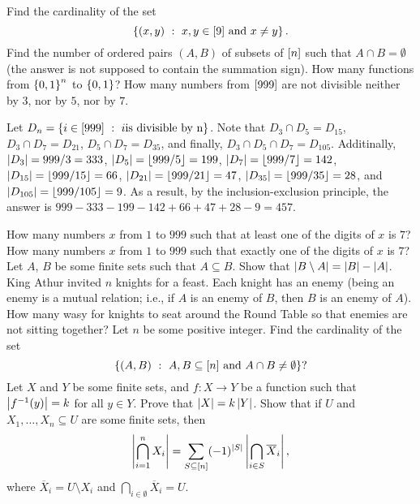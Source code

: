 \begin{chapterendexercises}
  \exercise
    Find the cardinality of the set
    \[
      \set[{x, y \in \range{9} \text{ and } x \neq y}]{(x, y)}.
    \]
  \exercise Find the number of ordered pairs $(A, B)$ of subsets of ${[{n}]}$
    such that $A \cap B = \emptyset$ (the answer is not supposed to contain the
    summation sign).
  \exercise How many functions from $\set{0, 1}^n$ to $\set{0, 1}$?
  \exercise[recommended] How many numbers from ${[{999}]}$ are not divisible neither by $3$,
    nor by $5$, nor by $7$.
    \begin{solution}
      Let $D_n = \set[i \text{is divisible by n}]{i \in \range{999}}$.
      Note that $D_3 \cap D_5 = D_{15}$, $D_3 \cap D_7 = D_{21}$, $D_5 \cap D_7
      = D_{35}$, and finally, $D_3 \cap D_5 \cap D_7 = D_{105}$. Additinally,
      $\left|{D_3}\right| = 999 / 3 = 333$,
      $\left|{D_5}\right| = \left\lfloor {999 / 5} \right\rfloor = 199$,
      $\left|{D_7}\right| = \left\lfloor {999 / 7} \right\rfloor = 142$,
      $\left|{D_{15}}\right| = \left\lfloor {999 / 15} \right\rfloor = 66$,
      $\left|{D_{21}}\right| = \left\lfloor {999 / 21} \right\rfloor = 47$,
      $\left|{D_{35}}\right| = \left\lfloor {999 / 35} \right\rfloor = 28$, and
      $\left|{D_{105}}\right| = \left\lfloor {999 / 105} \right\rfloor = 9$.
      As a result, by the inclusion-exclusion principle, the answer is
      $999 - 333 - 199 - 142 + 66 + 47 + 28 - 9 = 457$.
    \end{solution}
  \exercise How many numbers $x$ from $1$ to $999$ such that at least one
    of the digits of $x$ is $7$?
  \exercise How many numbers $x$ from $1$ to $999$ such that exactly one
    of the digits of $x$ is $7$?
  \exercise Let $A$, $B$ be some finite sets such that $A \subseteq B$.
    Show that $\left|{B \setminus A}\right| = \left|{B}\right| - \left|{A}\right|$.
  \exercise King Athur invited $n$ knights for a feast. Each knight has an enemy
    (being an enemy is a mutual relation; i.e., if $A$ is an enemy of $B$, then
    $B$ is an enemy of $A$). How many wasy for knights to seat around the Round
    Table so that enemies are not sitting together?
  \exercise[recommended] Let $n$ be some positive integer.
    Find the cardinality of the set
    \[
      \set[{A, B \subseteq \range{n} \text{ and } A \cap B \neq \emptyset}]{(A, B)}?
    \]
  \exercise Let $X$ and $Y$ be some finite sets, and $f : X \to Y$ be a function
    such that $\left|{f^{-1}(y)}\right| = k$ for all $y \in Y$. Prove that
    $\left|{X}\right| = k\left|{Y}\right|$.
  \exercise[recommended] Show that if $U$ and $X_1, \dots, X_n \subseteq U$ are
    some finite sets, then
    \[
      \left|{\bigcap_{i = 1}^n X_i}\right| =
      \sum_{S \subseteq {[{n}]}} (-1)^{\left|{S}\right|}
        \left|{\bigcap_{i \in S} \overline{X}_i}\right|,
    \]
    where $\overline{X}_i = U \setminus X_i$ and
    $\bigcap_{i \in \emptyset} \overline{X}_i = U$.
\end{chapterendexercises}
